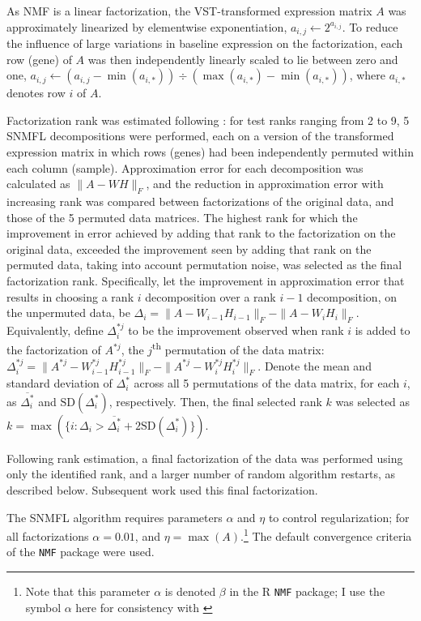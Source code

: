 \documentclass[dissertation.tex]{subfiles}
\begin{document}
As \gls{NMF} is a linear factorization, the \gls{VST}-transformed expression matrix $A$ was approximately linearized by elementwise exponentiation, $a_{i,j} \leftarrow 2^{a_{i,j}}$.  To reduce the influence of large variations in baseline expression on the factorization, each row (gene) of $A$ was then independently linearly scaled to lie between zero and one, $a_{i,j} \leftarrow (a_{i,j} - \min(a_{i,*})) \div (\max(a_{i,*}) - \min(a_{i,*}))$, where $a_{i,*}$ denotes row $i$ of $A$.

Factorization rank was estimated following \cite{Frigyesi2008}: for test ranks ranging from 2 to 9, 5 \gls{SNMFL} decompositions were performed, each on a version of the transformed expression matrix in which rows (genes) had been independently permuted within each column (sample).  Approximation error for each decomposition was calculated as $\|A - W H\|_F$, and the reduction in approximation error with increasing rank was compared between factorizations of the original data, and those of the 5 permuted data matrices.  The highest rank for which the improvement in error achieved by adding that rank to the factorization on the original data, exceeded the improvement seen by adding that rank on the permuted data, taking into account permutation noise, was selected as the final factorization rank.  Specifically, let the improvement in approximation error that results in choosing a rank $i$ decomposition over a rank $i-1$ decomposition, on the unpermuted data, be $\Delta_i = \|A - W_{i-1} H_{i-1}\|_F - \|A - W_{i} H_{i}\|_F$.  Equivalently, define $\Delta^{*j}_i$ to be the improvement observed when rank $i$ is added to the factorization of $A^{*j}$, the $j$\textsuperscript{th} permutation of the data matrix: $\Delta^{*j}_i = \|A^{*j} - W^{*j}_{i-1} H^{*j}_{i-1}\|_F - \|A^{*j} - W^{*j}_{i} H^{*j}_{i}\|_F$.  Denote the mean and standard deviation of $\Delta^{*}_i$ across all 5 permutations of the data matrix, for each $i$, as $\overline{\Delta^{*}_i}$ and $\text{SD}(\Delta^{*}_i)$, respectively.  Then, the final selected rank $k$ was selected as $k = \max(\{i : \Delta_i > \overline{\Delta^{*}_i} + 2 \text{SD}(\Delta^{*}_i)\})$.

Following rank estimation, a final factorization of the data was performed using only the identified rank, and a larger number of random algorithm restarts, as described below.  Subsequent work used this final factorization.

The \gls{SNMFL} algorithm requires parameters $\alpha$ and $\eta$ to control regularization; for all factorizations $\alpha = 0.01$, and $\eta = \max(A)$.\footnote{Note that this parameter $\alpha$ is denoted $\beta$ in the R \texttt{NMF} package; I use the symbol $\alpha$ here for consistency with \cite{Kim2007}}  The default convergence criteria of the \texttt{NMF} package were used.
\end{document}
